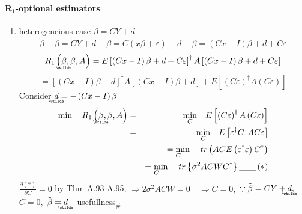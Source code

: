 \documentclass{article}
\begin{document}
\paragraph{R$_{1}$-optional estimators}

\begin{enumerate}
\item heterogeneious case $\tilde{\beta}=CY+d$%
\begin{equation*}
\tilde{\beta}-\beta =CY+d-\beta =C\left( x\beta +\varepsilon \right)
+d-\beta =\left( Cx-I\right) \beta +d+C\varepsilon
\end{equation*}%
\begin{equation*}
R_{1}\left( 
\underaccent{\wtilde}{\beta}%
,\beta ,A\right) =E\left[ \left( Cx-I\right) \beta +d+C\varepsilon \right]
^{\dagger }A\left[ \left( Cx-I\right) \beta +d+C\varepsilon \right]
\end{equation*}%
\begin{equation*}
=\left[ \left( Cx-I\right) \beta +d\right] ^{\dagger }A\left[ \left(
Cx-I\right) \beta +d\right] +E\left[ \left( C\varepsilon \right) ^{\dagger
}A\left( C\varepsilon \right) \right]
\end{equation*}%
Consider $%
\underaccent{\wtilde}{d}%
=-\left( Cx-I\right) \beta $%
\begin{eqnarray}
\min \quad R_{1}\left( 
\underaccent{\wtilde}{\beta}%
,\beta ,A\right) &=&\underset{C}{\min }\quad E\left[ \left( C\varepsilon
\right) ^{\dagger }A\left( C\varepsilon \right) \right]  \notag \\
&=&\underset{C}{\min }\quad E\left[ \varepsilon ^{\dagger }C^{\dagger
}AC\varepsilon \right]  \notag \\
&&\underset{C}{=\min }\quad tr\left( ACE\left( \varepsilon ^{\dagger
}\varepsilon \right) C^{\dagger }\right)  \notag \\
&&\underset{C}{=\min }\quad tr\left\{ \sigma ^{2}ACWC^{\dagger }\right\} 
\underline{\qquad }\left( \ast \right)
\end{eqnarray}%
$\frac{\partial \left( \ast \right) }{\partial C}=0$ by Thm A.93%
A.95, $\Rightarrow 2\sigma ^{2}ACW=0\quad \Rightarrow C=0,$ $\because \tilde{%
\beta}=CY+%
\underaccent{\wtilde}{d}%
,$ $C=0,$ $\tilde{\beta}=%
\underaccent{\wtilde}{d}%
\quad $usefullness$_{\#}$


\end{enumerate}
\end{document}
